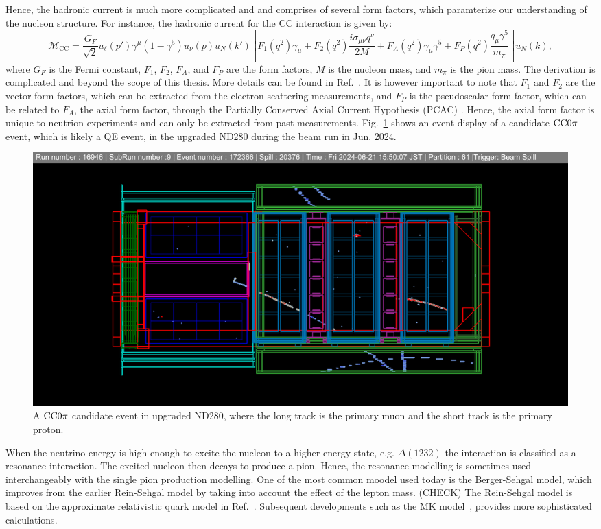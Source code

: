   Hence, the hadronic current is much more complicated and and comprises of several form factors, which paramterize our understanding of the nucleon structure.
  For instance, the hadronic current for the CC interaction is given by:
  \begin{equation}
    \mathcal{M}_{\text{CC}} = \frac{G_F}{\sqrt{2}} \bar{u}_\ell(p') \gamma^\mu (1 - \gamma^5) u_\nu(p) \bar{u}_N(k') \left[ F_1(q^2) \gamma_\mu + F_2(q^2) \frac{i \sigma_{\mu\nu} q^\nu}{2M} + F_A(q^2) \gamma_\mu \gamma^5 + F_P(q^2) \frac{q_\mu \gamma^5}{m_\pi} \right] u_N(k),
  \end{equation}
  where $G_F$ is the Fermi constant, $F_1$, $F_2$, $F_A$, and $F_P$ are the form factors, $M$ is the nucleon mass, and $m_\pi$ is the pion mass.
  The derivation is complicated and beyond the scope of this thesis. 
  More details can be found in Ref.~\cite{LlewellynSmith:1978te}.
  It is however important to note that $F_1$ and $F_2$ are the vector form factors, which can be extracted from the electron scattering measurements, and $F_P$ is the pseudoscalar form factor, which can be related to $F_A$, the axial form factor, through the Partially Conserved Axial Current Hypothesis (PCAC) .
  Hence, the axial form factor is unique to neutrion experiments and can only be extracted from past measurements.
  Fig.~\ref{fig:cc0pi} shows an event display of a candidate $\textrm{CC}0\pi$ event, which is likely a QE event, in the upgraded ND280 during the beam run in Jun. 2024.
  \begin{figure}[!htb] 	
      \centering 		
      \includegraphics[width=\sgfigwid\textwidth]{figures/cc0pi.png}
      \caption{\label{fig:cc0pi} A $\textrm{CC}0\pi$ candidate event in upgraded ND280, where the long track is the primary muon and the short track is the primary proton.} 
  \end{figure}

  When the neutrino energy is high enough to excite the nucleon to a higher energy state, e.g. $\Delta(1232)$ the interaction is classified as a resonance interaction.
  The excited nucleon then decays to produce a pion. 
  Hence, the resonance modelling is sometimes used interchangeably with the single pion production modelling.
  One of the most common moodel used today is the Berger-Sehgal model, which improves from the earlier Rein-Sehgal model by taking into account the effect of the lepton mass. (CHECK)
  The Rein-Sehgal model is based on the approximate relativistic quark model in Ref.~\cite{Feynman:1971wr}.
  Subsequent developments such as the MK model~\cite{Kabirnezhad:2017jmf,Kabirnezhad:2020wtp,Kabirnezhad:2022znc}, provides more sophisticated calculations.

